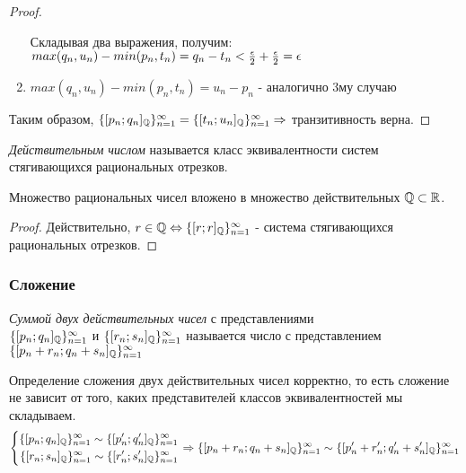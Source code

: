 \begin{proof}
\begin{enumerate}
        Складывая два выражения, получим:
        $max(q_n, u_n) - min(p_n, t_n) = q_n - t_n < \frac{\epsilon}{2} + \frac{\epsilon}{2} = \epsilon$
        \item $max(q_n, u_n) - min(p_n, t_n) = u_n - p_n$ - аналогично 3му случаю
    \end{enumerate}
    Таким образом, $\{[p_n; q_n]_{\mathbb{Q}}\}_{n = 1}^\infty = \{[t_n; u_n]_{\mathbb{Q}}\}_{n = 1}^\infty \Rightarrow$ транзитивность верна.
\end{proof}

\begin{definition}
    \textit{Действительным числом} называется класс эквивалентности систем стягивающихся рациональных отрезков.
\end{definition}

\begin{proposition}
    Множество рациональных чисел вложено в множество действительных $\mathbb{Q} \subset \mathbb{R}$.
\end{proposition}

\begin{proof}
    Действительно, $r \in \mathbb{Q} \Leftrightarrow \{[r;r]_{\mathbb{Q}}\}_{n = 1}^\infty$ - система стягивающихся рациональных отрезков.
\end{proof}

\subsubsection{Сложение}

\begin{definition}
    \textit{Суммой двух действительных чисел} с представлениями \\$\{[p_n; q_n]_{\mathbb{Q}}\}_{n = 1}^\infty$ и $\{[r_n; s_n]_{\mathbb{Q}}\}_{n = 1}^\infty$ называется число с представлением $\{[p_n + r_n; q_n + s_n]_{\mathbb{Q}}\}_{n = 1}^\infty$
\end{definition}

\begin{proposition}
    Определение сложения двух действительных чисел корректно, то есть сложение не зависит от того, каких представителей классов эквивалентностей мы складываем.
    $$
    \left\{\begin{aligned}\{[p_n; q_n]_{\mathbb{Q}}\}_{n = 1}^\infty \sim \{[p'_n; q'_n]_{\mathbb{Q}}\}_{n = 1}^\infty \\ 
            \{[r_n; s_n]_{\mathbb{Q}}\}_{n = 1}^\infty \sim \{[r'_n; s'_n]_{\mathbb{Q}}\}_{n = 1}^\infty\end{aligned}\right.
    \Rightarrow
    \{[p_n + r_n; q_n + s_n]_{\mathbb{Q}}\}_{n = 1}^\infty \sim \{[p'_n + r'_n; q'_n + s'_n]_{\mathbb{Q}}\}_{n = 1}^\infty
    $$
\end{proposition}

